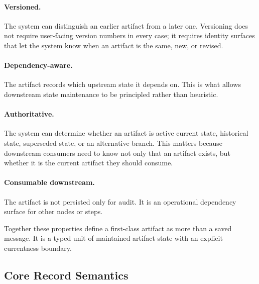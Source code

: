 \documentclass{article}
\begin{document}
\paragraph{Versioned.} The system can distinguish an earlier artifact from a later one. Versioning does not require user-facing version numbers in every case; it requires identity surfaces that let the system know when an artifact is the same, new, or revised.

\paragraph{Dependency-aware.} The artifact records which upstream state it depends on. This is what allows downstream state maintenance to be principled rather than heuristic.

\paragraph{Authoritative.} The system can determine whether an artifact is active current state, historical state, superseded state, or an alternative branch. This matters because downstream consumers need to know not only that an artifact exists, but whether it is the current artifact they should consume.

\paragraph{Consumable downstream.} The artifact is not persisted only for audit. It is an operational dependency surface for other nodes or steps.

Together these properties define a first-class artifact as more than a saved message. It is a typed unit of maintained artifact state with an explicit currentness boundary.

\subsection{Core Record Semantics}
\end{document}
